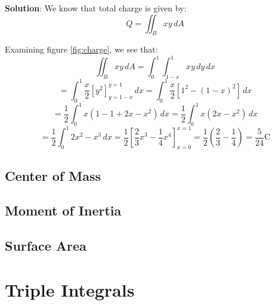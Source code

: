 \textbf{Solution}: We know that total charge is given by:
$$Q = \iint_{\textit{B}} xy\,dA$$ 

Examining figure \ref{fig:charge}, we see that:
$$\iint_{\textit{B}} xy\,dA = \int_0^1 \int_{1 - x}^1 xy\,dy\,dx$$
$$= \int_0^1 \frac{x}{2} \left[ y^2 \right]_{y = 1 - x}^{y = 1}\,dx = \int_0^1 
\frac{x}{2} \left[ 1^2 - \left( 1 - x \right)^2 \right]\,dx$$
$$= \frac{1}{2} \int_0^1 x \left(1 - 1 + 2x - x^2 \right)\,dx = \frac{1}{2} 
\int_0^1 x \left(2x - x^2 \right)\,dx$$
$$= \frac{1}{2} \int_0^1 2x^2 - x^3\,dx = \frac{1}{2} \left[ \frac{2}{3}x^3 - 
\frac{1}{4}x^4 \right]_{x = 0}^{x = 1} = \frac{1}{2} \left( \frac{2}{3} - 
\frac{1}{4} \right) = \frac{5}{24} \text{C}$$


\subsection{Center of Mass}

\subsection{Moment of Inertia}

\subsection{Surface Area}

\section{Triple Integrals}
